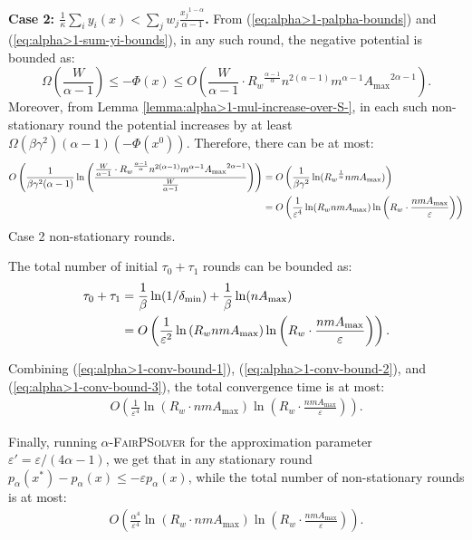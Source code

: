 \documentclass[11pt]{article}
\makeatletter
\newcommand{\wratio}{R_w}
\newenvironment{proofof}[1]{\par
  \pushQED{\qed}\normalfont \topsep3\p@\relax
  \trivlist
  \item[\hskip\labelsep
        \bfseries
    Proof of #1\@addpunct{.}]\ignorespaces
}{\popQED\endtrivlist\@endpefalse
}
\makeatother
\begin{document}
\begin{proofof}{Theorem \ref{thm:convergence-alpha>1}}
\noindent\textbf{Case 2: $\frac{1}{\kappa}\sum_{i} y_i(x) < \sum_j w_j \frac{{x_j}^{1-\alpha}}{\alpha-1}$.} From (\ref{eq:alpha>1-palpha-bounds}) and (\ref{eq:alpha>1-sum-yi-bounds}), in any such round, the negative potential is bounded as:
\begin{equation*}
\Omega\left(\frac{W}{\alpha-1}\right)\leq-\Phi(x)\leq O\left(\frac{W}{\alpha-1}\cdot{{\wratio}^{\frac{\alpha-1}{\alpha}}n^{2(\alpha-1)}m^{\alpha-1}{A_{\max}}^{2\alpha -1}}\right). 
\end{equation*}
Moreover, from Lemma \ref{lemma:alpha>1-mul-increase-over-S-}, in each such non-stationary round the potential increases by at least $\Omega\left(\beta\gamma^2\right)(\alpha-1)(-\Phi(x^0))$. Therefore, there can be at most:
\begin{align}
O\left(\frac{1}{\beta\gamma^2(\alpha-1)}\ln\left(\frac{\frac{W}{\alpha-1}\cdot{{\wratio}^{\frac{\alpha-1}{\alpha}}n^{2(\alpha-1)}m^{\alpha-1}{A_{\max}}^{2\alpha -1}}}{\frac{W}{\alpha-1}}\right)\right) &= O\left(\frac{1}{\beta\gamma^2}\ln({\wratio}^{\frac{1}{\alpha}} nmA_{\max})\right)\notag\\
&= O\left(\frac{1}{\varepsilon^4}\ln(\wratio nmA_{\max})\ln\left(\wratio\cdot\frac{nmA_{\max}}{\varepsilon}\right)\right)\label{eq:alpha>1-conv-bound-2}
\end{align}
Case 2 non-stationary rounds.

The total number of initial $\tau_0+\tau_1$ rounds can be bounded as:
\begin{align}
\tau_0+\tau_1 &= \frac{1}{\beta}\ln(1/\delta_{\min}) + \frac{1}{\beta}\ln(nA_{\max})\notag\\
&= O\left(\frac{1}{\varepsilon^2}\ln\left(\wratio nmA_{\max}\right)\ln\left(\wratio \cdot\frac{nmA_{\max}}{\varepsilon}\right)\right). \label{eq:alpha>1-conv-bound-3}
\end{align}

Combining (\ref{eq:alpha>1-conv-bound-1}), (\ref{eq:alpha>1-conv-bound-2}), and (\ref{eq:alpha>1-conv-bound-3}), the total convergence time is at most:
\begin{align*}
O\left(\frac{1}{\varepsilon^4}\ln\left(\wratio\cdot{nmA_{\max}}\right)\ln\left(\wratio\cdot\frac{nmA_{\max}}{\varepsilon}\right)\right).
\end{align*} 

Finally, running \textsc{$\alpha$-FairPSolver} for the approximation parameter $\varepsilon' = \varepsilon/(4\alpha-1)$, we get that in any stationary round $p_\alpha(x^*)-p_{\alpha}(x)\leq -\varepsilon p_{\alpha}(x)$, while the total number of non-stationary rounds is at most:
\begin{align*}
O\left(\frac{\alpha^4}{\varepsilon^4}\ln\left(\wratio\cdot{nmA_{\max}}\right)\ln\left(\wratio\cdot\frac{nmA_{\max}}{\varepsilon}\right)\right).
\end{align*} 
\end{proofof}
\end{document}
